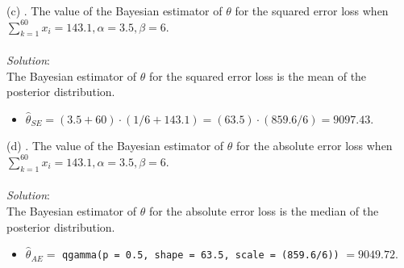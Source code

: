 \documentclass[12pt]{article}
\newcommand{\XB}{\color{black}}
\newcommand{\XBB}{\color{blue}}
\newcommand{\ds}{\displaystyle}
\begin{document}
\vspace{2.5mm}

(c) . The value of the Bayesian estimator of $ \theta $ for the squared error loss when \\ 
$ \sum_{k=1}^{60} x_{i} = 143.1, \alpha = 3.5, \beta = 6 $. \\
\vspace{2.5mm} \\
\textit{Solution}:
\vspace{2.5mm} \\

\noindent
The Bayesian estimator of $ \theta $ for the squared error loss is the mean of the posterior distribution. \\

\begin{itemize}
    \item $ \ds \hat{\theta}_{SE} = (3.5 + 60) \cdot (1 / 6 + 143.1) = (63.5) \cdot (859.6 / 6) = 9097.43$.
\end{itemize}

\vspace{2.5mm}

(d) . The value of the Bayesian estimator of $ \theta $ for the absolute error loss when \\ 
$ \sum_{k=1}^{60} x_{i} = 143.1, \alpha = 3.5, \beta = 6 $. \\
\vspace{2.5mm} \\
\textit{Solution}:
\vspace{2.5mm} \\

\noindent
The Bayesian estimator of $ \theta $ for the absolute error loss is the median of the posterior distribution. \\

\begin{itemize}
    \item $ \ds \hat{\theta}_{AE} = $ {\XBB \texttt{qgamma(p = 0.5, shape = 63.5, scale = (859.6/6))}} $ = 9049.72 $.
\end{itemize}

\vspace{2.5mm}

\newpage
\XBB\hrulefill\XB \\
\end{document}
